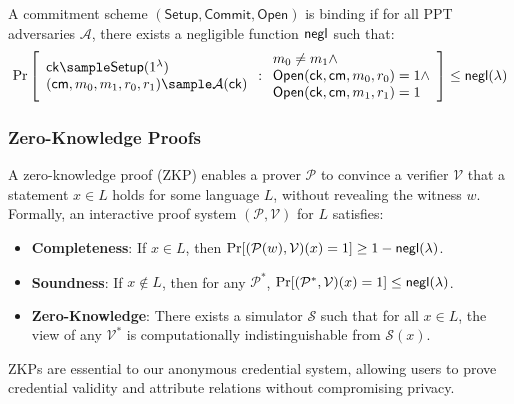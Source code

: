 \begin{definition}[Binding]
A commitment scheme $(\mathsf{Setup}, \mathsf{Commit}, \mathsf{Open})$ is binding if for all PPT adversaries $\mathcal{A}$, there exists a negligible function $\mathsf{negl}$ such that:
$$\Pr\left[\begin{array}{l}
    \mathsf{ck} \sample \mathsf{Setup}(1^\lambda) \\
    (\mathsf{cm}, m_0, m_1, r_0, r_1) \sample \mathcal{A}(\mathsf{ck})
\end{array} : \begin{array}{l}
    m_0 \neq m_1 \land \\
    \mathsf{Open}(\mathsf{ck}, \mathsf{cm}, m_0, r_0) = 1 \land \\
    \mathsf{Open}(\mathsf{ck}, \mathsf{cm}, m_1, r_1) = 1
\end{array}\right] \leq \negl(\lambda)$$
\end{definition}

\subsubsection{Zero-Knowledge Proofs}
A zero-knowledge proof (ZKP) enables a prover $\mathcal{P}$ to convince a verifier $\mathcal{V}$ that a statement $x \in L$ holds for some language $L$, without revealing the witness $w$. Formally, an interactive proof system $(\mathcal{P}, \mathcal{V})$ for $L$ satisfies:
\begin{itemize}
    \item \textbf{Completeness}: If $x \in L$, then $\Pr[(\mathcal{P}(w), \mathcal{V})(x) = 1] \geq 1 - \mathsf{negl}(\lambda)$.
    \item \textbf{Soundness}: If $x \notin L$, then for any $\mathcal{P}^*$, $\Pr[(\mathcal{P}^*, \mathcal{V})(x) = 1] \leq \mathsf{negl}(\lambda)$.
    \item \textbf{Zero-Knowledge}: There exists a simulator $\mathcal{S}$ such that for all $x \in L$, the view of any $\mathcal{V}^*$ is computationally indistinguishable from $\mathcal{S}(x)$.
\end{itemize}
ZKPs are essential to our anonymous credential system, allowing users to prove credential validity and attribute relations without compromising privacy.

